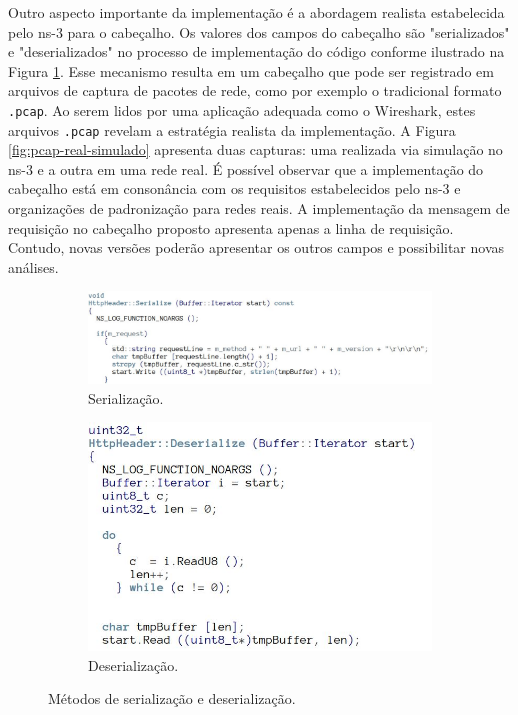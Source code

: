 Outro aspecto importante da implementação é a abordagem realista estabelecida pelo ns-3 para o cabeçalho. Os valores dos campos do cabeçalho são "serializados" e "deserializados" no processo de implementação do código conforme ilustrado na Figura \ref{fig:serialize-deserialize}. Esse mecanismo resulta em um cabeçalho que pode ser registrado em arquivos de captura de pacotes de rede, como por exemplo o tradicional formato \verb|.pcap|. Ao serem lidos por uma aplicação adequada como o Wireshark, estes arquivos \verb|.pcap| revelam a estratégia realista da implementação. A Figura \ref{fig:pcap-real-simulado} apresenta duas capturas: uma realizada via simulação no ns-3 e a outra em uma rede real. É possível observar que a implementação do cabeçalho está em consonância com os requisitos estabelecidos pelo ns-3 e organizações de padronização para redes reais. A implementação da mensagem de requisição no cabeçalho proposto apresenta apenas a linha de requisição. Contudo, novas versões poderão apresentar os outros campos e possibilitar novas análises.

\begin{figure}[h]
	\centering
	\begin{subfigure}[t]{\textwidth}
		\centering
		\includegraphics[width=0.9\linewidth]{textuais/serialize.jpg}
		\caption{Serialização.}
	\end{subfigure}
	\begin{subfigure}[t]{\textwidth}
		\centering
		\includegraphics[width=0.5\linewidth]{textuais/deserialize.jpg}
		\caption{Deserialização.}
	\end{subfigure}
	\caption{Métodos de serialização e deserialização.}
	\label{fig:serialize-deserialize}
\end{figure}


